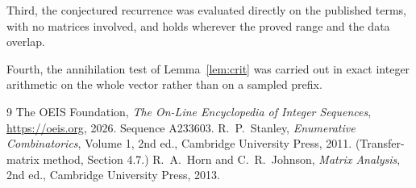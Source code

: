 \documentclass[11pt,a4paper]{article}
\theoremstyle{plain}
\theoremstyle{definition}
\begin{document}
Third, the conjectured recurrence was evaluated directly on the published terms, with no
matrices involved, and holds wherever the proved range and the data overlap.

Fourth, the annihilation test of Lemma~\ref{lem:crit} was carried out in exact integer
arithmetic on the whole vector rather than on a sampled prefix.

\begin{thebibliography}{9}
 The OEIS Foundation, \emph{The On-Line Encyclopedia of Integer
Sequences}, \url{https://oeis.org}, 2026. Sequence A233603.
 R.~P.~Stanley, \emph{Enumerative Combinatorics}, Volume 1, 2nd ed.,
Cambridge University Press, 2011. (Transfer-matrix method, Section 4.7.)
 R.~A.~Horn and C.~R.~Johnson, \emph{Matrix Analysis}, 2nd ed., Cambridge
University Press, 2013.
\end{thebibliography}
\end{document}
